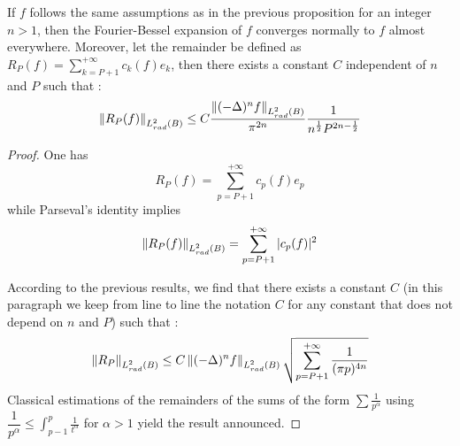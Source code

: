 \documentclass[11pt,a4paper]{article}
\begin{document}
\begin{Cor} If $f$ follows the same assumptions as in the previous proposition for an integer $n>1$, then the Fourier-Bessel expansion of $f$ converges normally to $f$ almost everywhere. Moreover, let the remainder be defined as $R_P(f) = \displaystyle\sum_{k = P+1}^{+\infty} c_{k}(f) e_{k}$, then there exists a constant $C$ independent of $n$ and $P$ such that : 
\[\left\|R_P(f)\right\|_{L^2_{rad}(B)} \leq C\dfrac{\left\|(-\Delta)^n f\right\|_{L^2_{rad}(B)}}{\pi^{2n}}\dfrac{1}{n^{\frac{1}{2}}P^{2n-\frac{1}{2}}}\]
\label{EstimationRest}

\begin{proof}
One has 
\[R_P(f) = \sum_{p=P+1}^{+\infty}c_p(f) e_p\]
while Parseval's identity implies
\[\left\|R_P(f)\right\|_{L^2_{rad}(B)} = \sum_{p=P+1}^{+\infty}|c_p(f)|^2\]

According to the previous results, we find that there exists a constant $C$ (in this paragraph we keep from line to line the notation $C$ for any constant that does not depend on $n$ and $P$) such that :
\[\left\|R_P\right\|_{L^2_{rad}(B)} \leq C \left\|(-\Delta)^n f\right\|_{L^2_{rad}(B)}\sqrt{\sum_{p= P+1}^{+\infty} \dfrac{1}{(\pi p)^{4n}}} \]
Classical estimations of the remainders of the sums of the form $\sum \frac{1}{p^{\alpha}}$ using $\dfrac{1}{p^{\alpha}} \leq \displaystyle\int_{p-1}^{p} \frac{1}{t^\alpha}$ for $\alpha >1$  yield the result announced. 

\end{proof}

\end{Cor}
\end{document}
